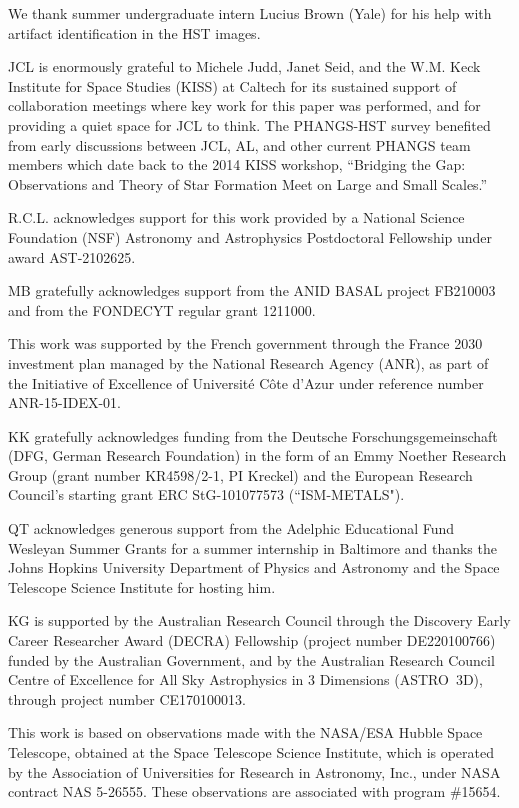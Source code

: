 \documentclass[linenumbers]{aastex63}
\begin{document}
{We thank summer undergraduate intern Lucius Brown (Yale) for his help with artifact identification in the HST images.

JCL is enormously grateful to Michele Judd, Janet Seid, and the W.M. Keck Institute for Space Studies (KISS) at Caltech for its sustained support of collaboration meetings where key work for this paper was performed, and for providing a quiet space for JCL to think.  The PHANGS-HST survey benefited from early discussions between JCL, AL, and other current PHANGS team members which date back to the 2014 KISS workshop, ``Bridging the Gap: Observations and Theory of Star Formation Meet on Large and Small Scales.''

R.C.L. acknowledges support for this work provided by a National Science Foundation (NSF) Astronomy and Astrophysics Postdoctoral Fellowship under award AST-2102625.

MB gratefully acknowledges support from the ANID BASAL project FB210003 and from the FONDECYT regular grant 1211000.

This work was supported by the French government through the France 2030 investment plan managed by the National Research Agency (ANR), as part of the Initiative of Excellence of Université Côte d’Azur under reference number ANR-15-IDEX-01.

KK gratefully acknowledges funding from the Deutsche Forschungsgemeinschaft (DFG, German Research Foundation) in the form of an Emmy Noether Research Group (grant number KR4598/2-1, PI Kreckel) and the European Research Council’s starting grant ERC StG-101077573 (“ISM-METALS"). 

QT acknowledges generous support from the Adelphic Educational Fund Wesleyan Summer Grants for a summer internship in Baltimore and thanks the Johns Hopkins University Department of Physics and Astronomy and the Space Telescope Science Institute for hosting him.

KG is supported by the Australian Research Council through the Discovery Early Career Researcher Award (DECRA) Fellowship (project number DE220100766) funded by the Australian Government, and by the Australian Research Council Centre of Excellence for All Sky Astrophysics in 3 Dimensions (ASTRO~3D), through project number CE170100013.

This work is based on observations made with the NASA/ESA Hubble Space Telescope, obtained at the Space Telescope Science Institute, which is operated by the Association of Universities for Research in Astronomy, Inc., under NASA contract NAS 5-26555. These observations are associated with program \#15654. 


}
\end{document}
